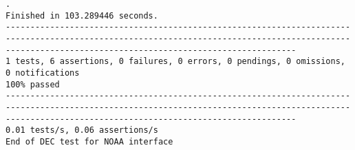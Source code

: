 \documentclass[dec_sum_main.tex]{subfiles}
\begin{document}
\begin{Verbatim}[fontsize=\tiny]
.
Finished in 103.289446 seconds.
-------------------------------------------------------------------------------------------------------------------------------------------------------------------------------------------------------
1 tests, 6 assertions, 0 failures, 0 errors, 0 pendings, 0 omissions, 0 notifications
100% passed
-------------------------------------------------------------------------------------------------------------------------------------------------------------------------------------------------------
0.01 tests/s, 0.06 assertions/s
End of DEC test for NOAA interface		
	\end{Verbatim}

\end{document}
